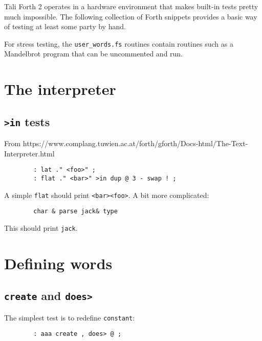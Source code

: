 
Tali Forth 2 operates in a hardware environment that makes built-in
tests pretty much impossible. The following collection of
Forth snippets provides a basic way of testing at least some party by hand.

For stress testing, the \texttt{user\_words.fs} routines contain routines such as
a Mandelbrot program that can be uncommented and run.

\section{The interpreter}

\subsection{\texttt{>in} tests}

From
https://www.complang.tuwien.ac.at/forth/gforth/Docs-html/The-Text-Interpreter.html

\begin{lstlisting}
        : lat ." <foo>" ;
        : flat ." <bar>" >in dup @ 3 - swap ! ; 
\end{lstlisting}

\noindent A simple \texttt{flat} should print \texttt{<bar><foo>}. A bit more complicated:

\begin{lstlisting}
        char & parse jack& type
\end{lstlisting}

\noindent This should print \texttt{jack}.


\section{Defining words}

\subsection{\texttt{create} and \texttt{does>}}
The simplest test is to redefine \texttt{constant}:

\begin{lstlisting}
        : aaa create , does> @ ; 
\end{lstlisting}



